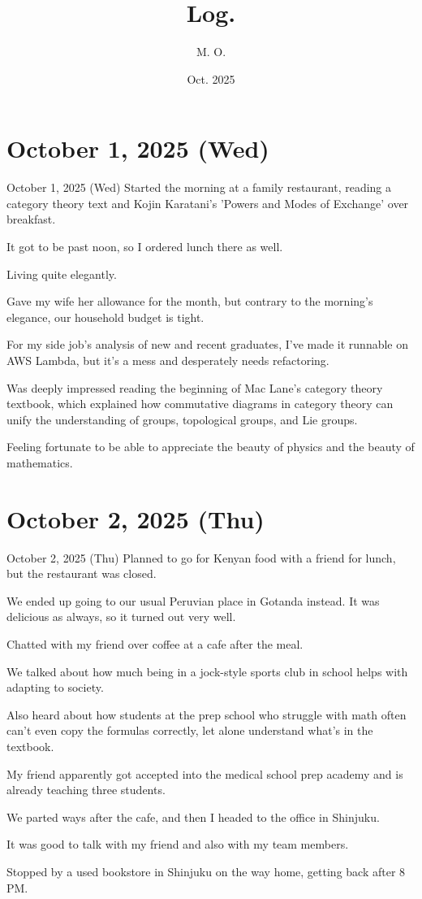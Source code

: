 \documentclass[dvipdfmx, autodetect-engine, aspectratio=169, 10.5pt]{beamer}
\title{
Log.
}
\author{
M. O.
}
\date{Oct. 2025}
\begin{document}
\maketitle

\section{October 1, 2025 (Wed)}

\begin{frame}{October 1, 2025 (Wed)}
Started the morning at a family restaurant, reading a category theory text and Kojin Karatani's 'Powers and Modes of Exchange' over breakfast.

It got to be past noon, so I ordered lunch there as well.

Living quite elegantly.

Gave my wife her allowance for the month, but contrary to the morning's elegance, our household budget is tight.

For my side job's analysis of new and recent graduates, I've made it runnable on AWS Lambda, but it's a mess and desperately needs refactoring.

Was deeply impressed reading the beginning of Mac Lane's category theory textbook, which explained how commutative diagrams in category theory can unify the understanding of groups, topological groups, and Lie groups.

Feeling fortunate to be able to appreciate the beauty of physics and the beauty of mathematics.
\end{frame}

\section{October 2, 2025 (Thu)}

\begin{frame}{October 2, 2025 (Thu)}
Planned to go for Kenyan food with a friend for lunch, but the restaurant was closed.

We ended up going to our usual Peruvian place in Gotanda instead.
It was delicious as always, so it turned out very well.

Chatted with my friend over coffee at a cafe after the meal.

We talked about how much being in a jock-style sports club in school helps with adapting to society.

Also heard about how students at the prep school who struggle with math often can't even copy the formulas correctly, let alone understand what's in the textbook.

My friend apparently got accepted into the medical school prep academy and is already teaching three students.

We parted ways after the cafe, and then I headed to the office in Shinjuku.

It was good to talk with my friend and also with my team members.

Stopped by a used bookstore in Shinjuku on the way home, getting back after 8 PM.
\end{frame}
\end{document}
